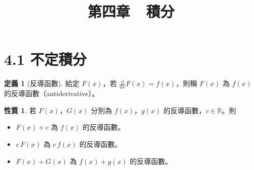 \documentclass[12pt]{extarticle}
\newcommand{\ds}{\displaystyle}
\theoremstyle{definition}
\newtheorem*{dfn}{定義}
\newtheorem*{prp}{性質}
\begin{document}
\title{\texorpdfstring{\vspace{-16mm} 第四章\ \ 積分}{第四章\ \ 積分}} 
\author{\vspace{-5em}}
\date{\vspace{-5em}}
\maketitle
\thispagestyle{firststyle}

\section*{4.1 不定積分}

\begin{dfn}[反導函數]
  給定 $\ds F(x)$，若 $\ds\frac{\text{d}}{\text{d}x} F(x) = f(x)$，則稱 $F(x)$ 為 $f(x)$ 的反導函數（antiderivative）。 
\end{dfn}

\begin{prp}若 $\ds F(x)$，$\ds G(x)$ 分別為 $f(x)$，$g(x)$ 的反導函數，$c\in\mathbb{R}$。則
  \begin{itemize}\setlength\itemsep{0em}
    \item $\ds F(x) + c$ 為 $f(x)$ 的反導函數。
    \item $\ds c\,F(x)$ 為 $c\,f(x)$ 的反導函數。
    \item $\ds F(x) + G(x)$ 為 $f(x) + g(x)$ 的反導函數。
  \end{itemize}
\end{prp}
\end{document}
